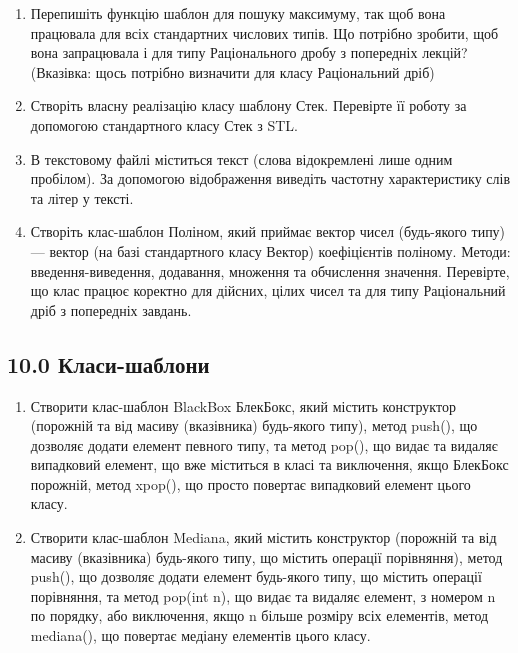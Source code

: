 \documentclass[]{article}
\begin{document}
\begin{enumerate}
\def\labelenumi{\arabic{enumi})}
\item
  Перепишіть функцію шаблон для пошуку максимуму, так щоб вона працювала
  для всіх стандартних числових типів. Що потрібно зробити, щоб вона
  запрацювала і для типу Раціонального дробу з попередніх лекцій?
  (Вказівка: щось потрібно визначити для класу Раціональний дріб)
\item
  Створіть власну реалізацію класу шаблону Стек. Перевірте її роботу за
  допомогою стандартного класу Стек з STL.
\item
  В текстовому файлі міститься текст (слова відокремлені лише одним
  пробілом). За допомогою відображення виведіть частотну характеристику
  слів та літер у тексті.
\item
  Створіть клас-шаблон Поліном, який приймає вектор чисел (будь-якого
  типу) --- вектор (на базі стандартного класу Вектор) коефіцієнтів
  поліному. Методи: введення-виведення, додавання, множення та
  обчислення значення. Перевірте, що клас працює коректно для дійсних,
  цілих чисел та для типу Раціональний дріб з попередніх завдань.
\end{enumerate}

\subsection{10.0
Класи-шаблони}\label{ux43aux43bux430ux441ux438-ux448ux430ux431ux43bux43eux43dux438}

\begin{enumerate}
\def\labelenumi{\arabic{enumi})}
\item
  Створити клас-шаблон BlackBox БлекБокс, який містить конструктор
  (порожній та від масиву (вказівника) будь-якого типу), метод push(),
  що дозволяє додати елемент певного типу, та метод pop(), що видає та
  видаляє випадковий елемент, що вже міститься в класі та виключення,
  якщо БлекБокс порожній, метод xpop(), що просто повертає випадковий
  елемент цього класу.
\item
  Створити клас-шаблон Mediana, який містить конструктор (порожній та
  від масиву (вказівника) будь-якого типу, що містить операції
  порівняння), метод push(), що дозволяє додати елемент будь-якого типу,
  що містить операції порівняння, та метод pop(int n), що видає та
  видаляє елемент, з номером n по порядку, або виключення, якщо n більше
  розміру всіх елементів, метод mediana(), що повертає медіану елементів
  цього класу.
\end{enumerate}
\end{document}
